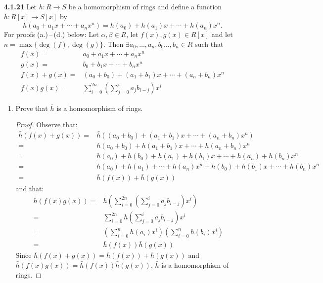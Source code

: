 \documentclass[12pt]{article}
\begin{document}
\begin{itemize}
\item[\textbf{4.1.21}] Let $h : R\to S$ be a homomorphism of rings and define a function $\bar{h} : R[x]\to S[x]$ by \[\bar{h}(a_0+a_1x+\dotsb+{a_n}x^n)=h(a_0)+h(a_1)x+\dotsb+h(a_n)x^n.\]
For proofs (a.)\,--\,(d.) below: Let $\alpha, \beta \in R$, let $f(x), g(x)\in R[x]$ and let $n={\max}\{\deg(f), \deg(g)\}$. Then $\exists a_0,\dotsc, a_n,b_0\dotsc,b_n\in R$ such that
\begin{align*}
  f(x) =& a_0 + a_1x + \dotsb + {a_n}x^n\\
  g(x) =& b_0 + b_1x + \dotsb + {b_n}x^n\\
  f(x) + g(x) =& (a_0 + b_0) + (a_1 + b_1)x + \dotsb + (a_n + b_n)x^n\\
  f(x) g(x) =& \sum_{i=0}^{2n}\left( \sum_{j=0}^{i} {a_j}b_{i-j}\right) x^i
\end{align*}
\begin{enumerate}[(a.)]
  \item Prove that $\bar{h}$ is a homomorphism of rings.
  \begin{proof} Observe that:
    \begin{align*}
      \bar{h}(f(x)+g(x))=&\bar{h}((a_0 + b_0) + (a_1 + b_1)x + \dotsb + (a_n + b_n)x^n)\\
      =&h(a_0 + b_0) + h(a_1 + b_1)x + \dotsb + h(a_n + b_n)x^n\\
      =&h(a_0) + h(b_0) + h(a_1) + h(b_1)x + \dotsb + h(a_n) + h(b_n)x^n\\
      =&h(a_0) + h(a_1) + \dotsb + h(a_n)x^n + h(b_0) + h(b_1)x + \dotsb + h(b_n)x^n\\
      =&\bar{h}(f(x))+\bar{h}(g(x))
    \end{align*}
    and that:
    \begin{align*}
      \bar{h}(f(x)g(x))=&\bar{h}\left( \sum_{i=0}^{2n}\left( \sum_{j=0}^{i} {a_j}b_{i-j}\right) x^i \right)\\
      =&\sum_{i=0}^{2n} h \left( \sum_{j=0}^{i} {a_j}b_{i-j}\right) x^i\\
      =&\left(\sum_{i=0}^{n} h \left( {a_i}\right) x^i\right) \left(\sum_{i=0}^{n} h \left( {b_i}\right) x^i\right)\\
      =&\bar{h}(f(x))\bar{h}(g(x))
    \end{align*}
    Since $\bar{h}(f(x)+g(x))=\bar{h}(f(x))+\bar{h}(g(x))$ and $\bar{h}(f(x)g(x))=\bar{h}(f(x))\bar{h}(g(x))$, $\bar{h}$ is a homomorphism of rings.
  \end{proof}


\end{enumerate}
\end{itemize}
\end{document}

